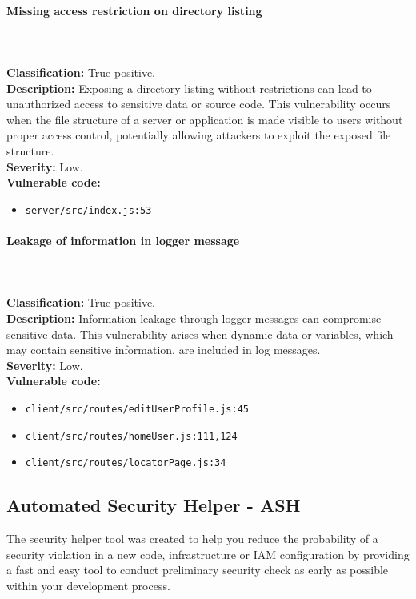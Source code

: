 \documentclass[]{article}
\begin{document}
\paragraph{Missing access restriction on directory listing} \mbox{} \\ \\
\textbf{Classification:} \hyperref[subsubsec:exposure_of_information_through_directory_listing]{True positive.} \\
\textbf{Description:} Exposing a directory listing without restrictions can lead to unauthorized access to sensitive data or source code. This vulnerability occurs when the file structure of a server or application is made visible to users without proper access control, potentially allowing attackers to exploit the exposed file structure. \\ 
\textbf{Severity:} Low. \\ 
\textbf{Vulnerable code:}
\begin{itemize}
    \item \texttt{server/src/index.js:53}
\end{itemize}

\paragraph{Leakage of information in logger message} \mbox{} \\ \\
\textbf{Classification:} True positive. \\
\textbf{Description:} Information leakage through logger messages can compromise sensitive data. This vulnerability arises when dynamic data or variables, which may contain sensitive information, are included in log messages. \\ 
\textbf{Severity:} Low. \\ 
\textbf{Vulnerable code:}
\begin{itemize}
    \item \texttt{client/src/routes/editUserProfile.js:45}
    \item \texttt{client/src/routes/homeUser.js:111,124}
    \item \texttt{client/src/routes/locatorPage.js:34}
\end{itemize}

\subsection{Automated Security Helper - ASH}
The security helper tool was created to help you reduce the probability of a security violation in a new code, infrastructure or IAM configuration by providing a fast and easy tool to conduct preliminary security check as early as possible within your development process.
\end{document}
